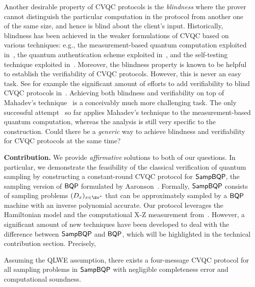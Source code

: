 Another desirable property of CVQC protocols is the \emph{blindness} where the prover cannot distinguish the particular computation in the protocol from another one of the same size, and hence is blind about the client's input.
Historically, blindness has been achieved in the weaker formulations of CVQC based on various techniques: e.g., the measurement-based quantum computation exploited in~\cite{BFK09}, the quantum authentication scheme exploited in~\cite{arXiv:ABOEM17}, and the self-testing technique exploited in~\cite{Nat:RUV13}.
Moreover, the blindness property is known to be helpful to establish the verifiability of CVQC protocols. However, this is never an easy task.
See for example the significant amount of efforts to add verifiability to blind CVQC protocols in~\cite{FK17}.
Achieving both blindness and verifiability on top of Mahadev's technique~\cite{FOCS:Mahadev18a} is a conceivably much more challenging task.
The only successful attempt~\cite{FOCS:GheVid19} so far applies Mahadev's technique to the measurement-based quantum computation,
whereas the analysis is still very specific to the construction.
Could there be a \emph{generic} way to achieve blindness and verifiability for CVQC protocols at the same time?


\vspace{2mm} \noindent \textbf{Contribution.} We provide \emph{affirmative} solutions to both of our questions.
In particular, we demonstrate the feasibility of the classical verification of quantum sampling by
constructing a constant-round CVQC protocol for $\operatorname{\mathsf{SampBQP}}$, the sampling version of $\operatorname{\mathsf{BQP}}$ formulated by Aaronson~\cite{aaronson_2013}. Formally, $\operatorname{\mathsf{SampBQP}}$ consists of sampling problems $(D_x)_{x\in\zo^*}$ that can be approximately sampled by a $\operatorname{\mathsf{BQP}}$ machine with an inverse polynomial accurate. %
Our protocol leverages the Hamiltonian model and the computational X-Z measurement from~\cite{FOCS:Mahadev18a}.
However, a significant amount of new techniques have been developed to deal with the difference between $\operatorname{\mathsf{SampBQP}}$ and $\operatorname{\mathsf{BQP}}$, which will be highlighted in the technical contribution section. Precisely,
\begin{theorem}[informal]
Assuming the QLWE assumption, there exists a four-message CVQC protocol for all sampling problems in $\operatorname{\mathsf{SampBQP}}$ with negligible completeness error and computational soundness.
\end{theorem}

